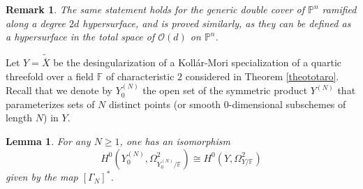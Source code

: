 \documentclass[10pt]{article}
\newtheorem{lemm}[theo]{Lemma}
\newtheorem{rema}[theo]{Remark}
\begin{document}
\begin{rema}\label{rema2pourdouble}{\rm The same statement holds for the generic double cover of $\mathbb{P}^n$ ramified along a degree $2d$ hypersurface, and is proved similarly, as they  can be defined as a hypersurface in the total space of $\mathcal{O}(d)$   on $\mathbb{P}^n$.}
\end{rema}
Let $Y=\widetilde{\overline{X}}$ be the desingularization of a Koll\'ar-Mori specialization of a quartic threefold over  a field $\mathbb{F}$ of  characteristic $2$ considered in Theorem \ref{theototaro}. Recall that we denote by $Y^{(N)}_0$ the open set of the symmetric product $Y^{(N)}$ that parameterizes sets of $N$ distinct points (or smooth $0$-dimensional subschemes of length $N$) in $Y$.
\begin{lemm} \label{pro2form} For any $N\geq 1$, one has an isomorphism
$$H^0(Y^{(N)}_0,\Omega_{Y^{(N)}_0/\mathbb{F}}^2)\cong H^0(Y,\Omega_{Y/\mathbb{F}}^2)$$
given by the map $[\Gamma_N]^*$.
\end{lemm}
\end{document}
